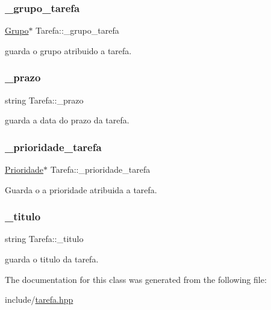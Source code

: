 \subsubsection{\texorpdfstring{\+\_\+grupo\+\_\+tarefa}{\_grupo\_tarefa}}
{\footnotesize\ttfamily \hyperlink{classGrupo}{Grupo}$\ast$ Tarefa\+::\+\_\+grupo\+\_\+tarefa\hspace{0.3cm}{\ttfamily [private]}}



guarda o grupo atribuido a tarefa. 

\mbox{\label{classTarefa_a4836ad542cc73ff37b4473587fc630cd}} 
\subsubsection{\texorpdfstring{\+\_\+prazo}{\_prazo}}
{\footnotesize\ttfamily string Tarefa\+::\+\_\+prazo\hspace{0.3cm}{\ttfamily [private]}}



guarda a data do prazo da tarefa. 

\mbox{\label{classTarefa_a2f41a39b7098d77a1e1773cb1a4177d4}} 
\subsubsection{\texorpdfstring{\+\_\+prioridade\+\_\+tarefa}{\_prioridade\_tarefa}}
{\footnotesize\ttfamily \hyperlink{classPrioridade}{Prioridade}$\ast$ Tarefa\+::\+\_\+prioridade\+\_\+tarefa\hspace{0.3cm}{\ttfamily [private]}}



Guarda o a prioridade atribuida a tarefa. 

\mbox{\label{classTarefa_a2ff0165cde44ccf91162eeb22edb2c4d}} 
\subsubsection{\texorpdfstring{\+\_\+titulo}{\_titulo}}
{\footnotesize\ttfamily string Tarefa\+::\+\_\+titulo\hspace{0.3cm}{\ttfamily [private]}}



guarda o titulo da tarefa. 



The documentation for this class was generated from the following file\+:\begin{DoxyCompactItemize}
\item 
include/\hyperlink{tarefa_8hpp}{tarefa.\+hpp}\end{DoxyCompactItemize}
